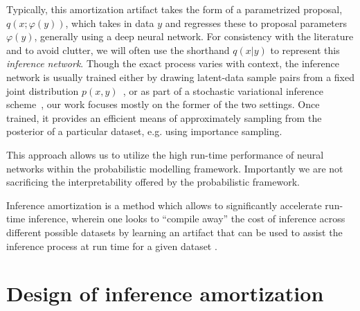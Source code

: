 \documentclass[12pt]{article}
\begin{document}


Typically, this amortization
artifact takes the form of a parametrized proposal, $q(x ; \varphi(y))$, which takes
in data $y$ and regresses these to proposal parameters $\varphi(y)$, generally using
a deep neural network.
For consistency with the literature and to avoid clutter, we will often
use the shorthand $q(x|y)$ to represent this \emph{inference network}.
Though the exact process varies with context,
the inference network is usually trained either by drawing latent-data
sample pairs from a fixed joint distribution
$p(x,y)$~\citep{ritchie2016deep,PaigeWood2016,LeEtAl2016}, or 
as part of a stochastic variational inference scheme~\citep{HoffmanEtAl2013,VAE,RezendeEtAl2014},
our work focuses mostly on the former of the two settings.
Once trained, it provides an efficient means of approximately
sampling from the posterior of a particular dataset, e.g. using importance sampling.

This approach allows us to utilize the high run-time performance of neural networks within the probabilistic modelling framework. 
Importantly we are not sacrificing the interpretability offered by the probabilistic framework.


Inference amortization is a method which allows to significantly accelerate run-time inference, wherein one looks to ``compile away'' the cost of inference
across different possible datasets
by learning an artifact that can be used to assist the inference process
at run time for a given dataset
\citep{StuhlmullerEtAl2013, VAE, ritchie2016deep, PaigeWood2016, LeEtAl2016, LeEtAl2017, FIVO, NaessethEtAl2017}.




\section{Design of inference amortization}
\label{sec:design}

\end{document}
